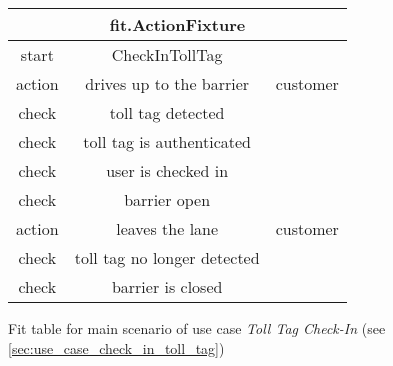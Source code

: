 \begin{figure}[H]
\begin{centering}
\begin{tabular}{|c|c|c|}
\hline 
\multicolumn{3}{|c|}{fit.ActionFixture}\tabularnewline
\hline 
start & CheckInTollTag & \tabularnewline
\hline 
action & drives up to the barrier & customer\tabularnewline
\hline 
check & toll tag detected & \tabularnewline
\hline 
check & toll tag is authenticated & \tabularnewline
\hline 
check & user is checked in & \tabularnewline
\hline 
check & barrier open & \tabularnewline
\hline 
action & leaves the lane & customer\tabularnewline
\hline 
check & toll tag no longer detected & \tabularnewline
\hline 
check & barrier is closed & \tabularnewline
\hline 
\end{tabular}
\caption{Fit table for main scenario of use case \emph{Toll Tag Check-In} (see \autoref{sec:use_case_check_in_toll_tag})}
\end{centering}
\end{figure}